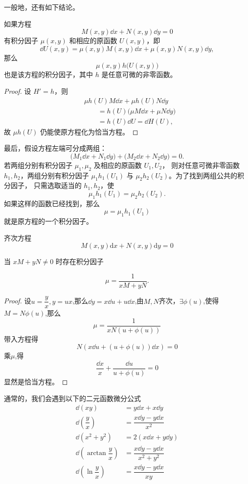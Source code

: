 一般地，还有如下结论。

\begin{theorem}\label{thm:积分因子的复合构造}
如果方程
\[
	M(x,y)\dd x+N(x,y)\dd y=0
\]
有积分因子 $\mu(x,y)$ 和相应的原函数 $U(x,y)$，即
\[
	\dd U(x,y)=\mu(x,y)M(x,y)\dd x+\mu(x,y)N(x,y)\dd y,
\]
那么
\[
	\mu(x,y)h\bigl(U(x,y)\bigr)
\]
也是该方程的积分因子，其中 $h$ 是任意可微的非零函数。
\end{theorem}

\begin{proof}
设 $H'=h$，则
\[
	\begin{aligned}
	&\mu h(U)M\dd x+\mu h(U)N\dd y\\
	&\qquad=h(U)\bigl(\mu M\dd x+\mu N\dd y\bigr)\\
	&\qquad=h(U)\dd U=\dd H(U),
	\end{aligned}
\]
故 $\mu h(U)$ 仍能使原方程化为恰当方程。
\end{proof}

最后，假设方程左端可分成两组：
\[
	\bigl(M_1\dd x+N_1\dd y\bigr)
	+\bigl(M_2\dd x+N_2\dd y\bigr)=0.
\]
若两组分别有积分因子 $\mu_1,\mu_2$ 及相应的原函数 $U_1,U_2$，
则对任意可微非零函数 $h_1,h_2$，两组分别有积分因子
$\mu_1h_1(U_1)$ 与 $\mu_2h_2(U_2)$。为了找到两组公共的积分因子，
只需选取适当的 $h_1,h_2$，使
\[
	\mu_1h_1(U_1)=\mu_2h_2(U_2).
\]
如果这样的函数已经找到，那么
\[
	\mu=\mu_1h_1(U_1)
\]
就是原方程的一个积分因子。
\begin{proposition}\label{prop:齐次微分形式的积分因子}
齐次方程
$$
M(x, y) \mathrm{d} x+N(x, y) \mathrm{d} y=0
$$

当 $x M+y N \neq 0$ 时存在积分因子

$$
\mu=\dfrac{1}{x M+y N} .
$$
\end{proposition}
\begin{proof}
	设$u=\dfrac{y}{x},y=ux$,那么$\dd y=x\dd u+u\dd x$,由$M,N$齐次，$\exists \phi(u)$,使得$M=N\phi (u)$,那么
	\[\mu = \dfrac{1}{xN(u+\phi(u))}\]
	带入方程得
	\[N(x\dd u +(u+\phi(u))\dd x)=0\]
	乘$\mu$,得
	\[\dfrac{\dd x}{x}+\dfrac{\dd u }{u+\phi(u)}=0\]
	显然是恰当方程。
\end{proof}
通常的，我们会遇到以下的二元函数微分公式
\[ \begin{aligned}
	\dd (xy)&=y\dd x+x\dd y\\
	\dd (\dfrac{y}{x})&=\dfrac{x\dd y-y\dd x}{x^2}\\
	\dd (x^2+y^2)&=2(x\dd x+y\dd y)\\
	\dd (\arctan\dfrac{y}{x})&=\dfrac{x\dd y-y\dd x}{x^2+y^2}\\
	\dd(\ln\dfrac{y}{x})&=\dfrac{x\dd y-y\dd x}{xy}
\end{aligned} \]

